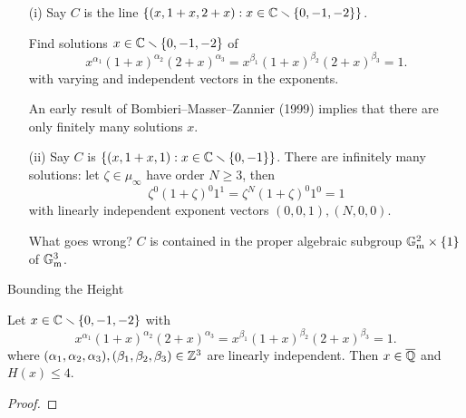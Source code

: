 \documentclass{beamer}
\begin{document}
\begin{frame}
  \begin{example}
    \begin{enumerate}
    \item [(i)]
      Say $C$ is the line $\left\{(x,1+x,2+x) : x\in {\mathbb{C}}\smallsetminus\{0,-1,-2\}\right\}$.
      
      Find solutions  $x\in{\mathbb{C}}\smallsetminus\{0,-1,-2\}$ of 
      \begin{equation*}
        x^{\alpha_1} (1+x)^{\alpha_2} (2+x)^{\alpha_3} =
        x^{\beta_1} (1+x)^{\beta_2} (2+x)^{\beta_3} = 1.
      \end{equation*}
      with \alert{varying} and \alert{independent}  vectors in the
      exponents.

      An early result of Bombieri--Masser--Zannier (1999) implies
      that there are only \alert{finitely} many solutions $x$.

    \item[(ii)] Say $C$ is $\{(x,1+x,1) : x\in {\mathbb{C}}\smallsetminus \{0,-1\}\}$.
      There are \alert{infinitely} many solutions:  let
      $\zeta\in\mu_\infty$ have order $N\ge 3$, then 
      \begin{equation*}
        \zeta^{0} (1+\zeta)^{0} 1^{1} = \zeta^{N} (1+\zeta)^{0} 1^0 = 1
      \end{equation*}
      with linearly independent exponent vectors $(0,0,1),(N,0,0)$.

      What goes wrong? $C$ is contained in the proper algebraic subgroup
      ${\mathbb{G}}_{\mathrm{m}}^2\times \{1\}$ of ${\mathbb{G}}_{\mathrm{m}}^3$. 
    \end{enumerate}
  \end{example}  
\end{frame}

\begin{frame}{Bounding the Height}
  \begin{lemma}
    Let 
    $x\in{\mathbb{C}}\smallsetminus\{0,-1,-2\}$ with
    \begin{equation*}
      x^{\alpha_1} (1+x)^{\alpha_2} (2+x)^{\alpha_3} =
      x^{\beta_1} (1+x)^{\beta_2} (2+x)^{\beta_3} = 1.
    \end{equation*}
    where
    $(\alpha_1,\alpha_2,\alpha_3),(\beta_1,\beta_2,\beta_3)\in{\mathbb{Z}}^3$
    are linearly independent. Then $x\in{\overline{\mathbb{Q}}}$ and $H(x)\le 4$. 
  \end{lemma}
  \begin{proof}\renewcommand{\qedsymbol}{}
    \vspace{2cm}
  \end{proof}  
\end{frame}
\end{document}
